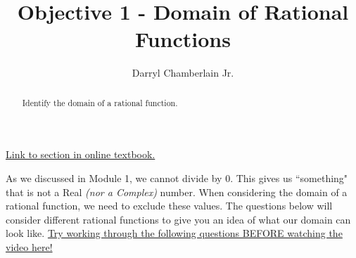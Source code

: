 \documentclass{ximera}
\author{Darryl Chamberlain Jr.}
\title{Objective 1 - Domain of Rational Functions}
\begin{document}
\begin{abstract}
Identify the domain of a rational function.
\end{abstract}
\maketitle

\href{https://cnx.org/contents/mwjClAV_@8.1:KNTP2r7D@13/Rational-Functions}{Link to section in online textbook.}


As we discussed in Module 1, we cannot divide by 0. This gives us ``something" that is not a Real \textit{(nor a Complex)} number. When considering the domain of a rational function, we need to exclude these values. The questions below will consider different rational functions to give you an idea of what our domain can look like. \href{https://www.youtube.com/watch?v=jCqSSp449UI}{Try working through the following questions BEFORE watching the video here!}
\end{document}
